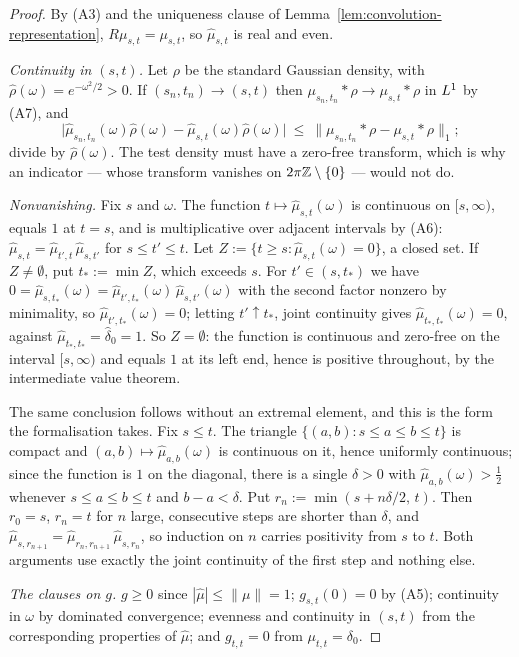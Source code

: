 \begin{proof}
By (A3) and the uniqueness clause of Lemma~\ref{lem:convolution-representation},
$R\mu_{s,t} = \mu_{s,t}$, so $\hat\mu_{s,t}$ is real and even.

\emph{Continuity in $(s,t)$.} Let $\rho$ be the standard Gaussian density, with
$\hat\rho(\omega) = e^{-\omega^2/2} > 0$. If $(s_n,t_n) \to (s,t)$ then
$\mu_{s_n,t_n} * \rho \to \mu_{s,t} * \rho$ in $L^1$ by (A7), and
\[
  \bigl|\hat\mu_{s_n,t_n}(\omega)\hat\rho(\omega) - \hat\mu_{s,t}(\omega)\hat\rho(\omega)\bigr|
  \ \le\ \|\mu_{s_n,t_n} * \rho - \mu_{s,t} * \rho\|_1 ;
\]
divide by $\hat\rho(\omega)$. The test density must have a zero-free transform, which is why an
indicator --- whose transform vanishes on $2\pi\mathbb{Z} \setminus \{0\}$ --- would not do.

\emph{Nonvanishing.} Fix $s$ and $\omega$. The function $t \mapsto \hat\mu_{s,t}(\omega)$ is
continuous on $[s,\infty)$, equals $1$ at $t = s$, and is multiplicative over adjacent intervals
by (A6): $\hat\mu_{s,t} = \hat\mu_{t',t}\,\hat\mu_{s,t'}$ for $s \le t' \le t$. Let
$Z := \{t \ge s : \hat\mu_{s,t}(\omega) = 0\}$, a closed set. If $Z \ne \emptyset$, put
$t_* := \min Z$, which exceeds $s$. For $t' \in (s,t_*)$ we have
$0 = \hat\mu_{s,t_*}(\omega) = \hat\mu_{t',t_*}(\omega)\,\hat\mu_{s,t'}(\omega)$ with the second
factor nonzero by minimality, so $\hat\mu_{t',t_*}(\omega) = 0$; letting $t' \uparrow t_*$,
joint continuity gives $\hat\mu_{t_*,t_*}(\omega) = 0$, against
$\hat\mu_{t_*,t_*} = \hat\delta_0 = 1$. So $Z = \emptyset$: the function is continuous and
zero-free on the interval $[s,\infty)$ and equals $1$ at its left end, hence is positive
throughout, by the intermediate value theorem.

The same conclusion follows without an extremal element, and this is the form the formalisation
takes. Fix $s \le t$. The triangle $\{(a,b) : s \le a \le b \le t\}$ is compact and
$(a,b) \mapsto \hat\mu_{a,b}(\omega)$ is continuous on it, hence uniformly continuous; since the
function is $1$ on the diagonal, there is a single $\delta > 0$ with
$\hat\mu_{a,b}(\omega) > \tfrac12$ whenever $s \le a \le b \le t$ and $b - a < \delta$. Put
$r_n := \min(s + n\delta/2,\, t)$. Then $r_0 = s$, $r_n = t$ for $n$ large, consecutive steps are
shorter than $\delta$, and $\hat\mu_{s,r_{n+1}} = \hat\mu_{r_n,r_{n+1}}\,\hat\mu_{s,r_n}$, so
induction on $n$ carries positivity from $s$ to $t$. Both arguments use exactly the joint
continuity of the first step and nothing else.

\emph{The clauses on $g$.} $g \ge 0$ since $|\hat\mu| \le \|\mu\| = 1$; $g_{s,t}(0) = 0$ by
(A5); continuity in $\omega$ by dominated convergence; evenness and continuity in $(s,t)$ from
the corresponding properties of $\hat\mu$; and $g_{t,t} = 0$ from $\mu_{t,t} = \delta_0$.
\end{proof}

